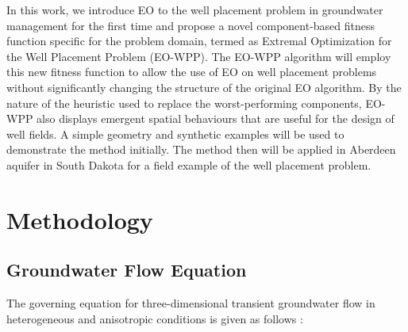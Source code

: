 \documentclass[authoryear]{elsarticle}
\begin{document}
In this work, we introduce EO to the well placement problem in groundwater management for the first time and propose a novel component-based fitness function specific for the problem domain, termed as Extremal Optimization for the Well Placement Problem (EO-WPP). The EO-WPP algorithm will employ this new fitness function to allow the use of EO on well placement problems without significantly changing the structure of the original EO algorithm.  By the nature of the heuristic used to replace the worst-performing components, EO-WPP also displays emergent spatial behaviours that are useful for the design of well fields. A simple geometry and synthetic examples will be used to demonstrate the method initially. The method then will be applied in Aberdeen aquifer in South Dakota for a field example of the well placement problem.





\section{Methodology}

\subsection{Groundwater Flow Equation}
The governing equation for three-dimensional transient groundwater flow in heterogeneous and anisotropic conditions is given as follows \citep{anderson2015applied}:
\end{document}
